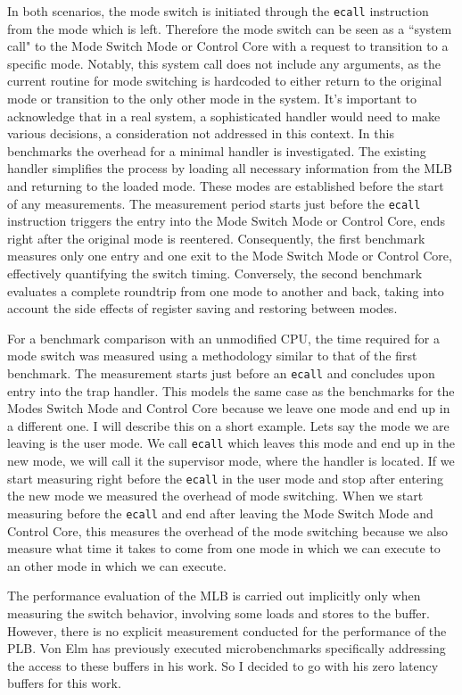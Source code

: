 In both scenarios, the mode switch is initiated through the \texttt{ecall}
instruction from the mode which is left. Therefore the mode switch can be seen
as a ``system call" to the Mode Switch Mode
or Control Core with a request to transition to a specific mode. Notably, this
system call does not include any arguments, as the current routine for mode
switching is hardcoded to either return to the original mode or transition to
the only other mode in the system. It's important to acknowledge that in a real
system, a sophisticated handler would need to make various decisions, a
consideration not addressed in this context. In this benchmarks the overhead for
a minimal handler is investigated. The existing handler simplifies the
process by loading all necessary information from the MLB and returning to the
loaded mode. These modes are established before the start of any
measurements. The measurement period starts just before the \texttt{ecall}
instruction triggers the entry into the Mode Switch Mode or Control Core,
ends right after the original mode is reentered. Consequently, the first
benchmark measures only one entry and one exit to the Mode Switch Mode or
Control Core, effectively quantifying the switch timing. Conversely, the second
benchmark evaluates a complete roundtrip from one mode to another and back,
taking into account the side effects of register saving and restoring between
modes.\par
For a benchmark comparison with an unmodified CPU, the time required for a
mode switch was measured using a methodology similar to that of the
first benchmark. The measurement starts just before an \texttt{ecall} and concludes
upon entry into the trap handler. This models the same case as the benchmarks
for the Modes Switch Mode and Control Core because we leave one mode and end up
in a different one. I will describe this on a short example. Lets say the mode
we are leaving is the user mode. We call \texttt{ecall} which leaves this mode
and end up in the new mode, we will call it the supervisor mode, where the
handler is located. If we start measuring right before the \texttt{ecall} in the
user mode and stop after entering the new mode we measured the overhead of
mode switching. When we start measuring before the \texttt{ecall} and end after
leaving the Mode Switch Mode and Control Core, this measures the overhead of the
mode switching because we also measure what time it takes to come from one mode
in which we can execute to an other mode in which we can execute.\par
The performance evaluation of the MLB is carried out implicitly only when
measuring the switch behavior, involving some loads and stores to the buffer.
However, there is no explicit measurement conducted for the performance of the
PLB. Von Elm\cite{Cve} has previously executed microbenchmarks specifically
addressing the access to these buffers in his work. So I decided to go with his
zero latency buffers for this work.

